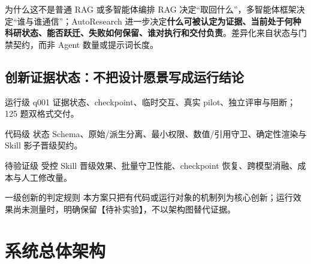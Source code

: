 \documentclass[10pt,a4paper,UTF8]{ctexart}
\begin{document}
\begin{innovationbox}{为什么这不是普通 RAG 或多智能体编排}
RAG 决定“取回什么”，多智能体框架决定“谁与谁通信”；AutoResearch 进一步决定\textbf{什么可被认定为证据、当前处于何种科研状态、能否跃迁、失败如何保留、谁对执行和交付负责}。差异化来自状态与门禁契约，而非 Agent 数量或提示词长度。
\end{innovationbox}

\subsection*{创新证据状态：不把设计愿景写成运行结论}
\begin{minipage}[t]{0.32\textwidth}\begin{evidencebox}{运行级}
q001 证据状态、checkpoint、临时交互、真实 pilot、独立评审与阻断；125 题双格式交付。
\end{evidencebox}\end{minipage}\hfill
\begin{minipage}[t]{0.32\textwidth}\begin{evidencebox}{代码级}
状态 Schema、原始/派生分离、最小权限、数值/引用守卫、确定性渲染与 Skill 影子晋级契约。
\end{evidencebox}\end{minipage}\hfill
\begin{minipage}[t]{0.32\textwidth}\begin{boundarybox}{待验证级}
受控 Skill 晋级效果、批量守卫性能、checkpoint 恢复、跨模型消融、成本与人工修改量。
\end{boundarybox}\end{minipage}

\begin{boundarybox}{一级创新的判定规则}
本方案只把有代码或运行对象的机制列为核心创新；运行效果尚未测量时，明确保留【待补实验】，不以架构图替代证据。
\end{boundarybox}
\clearpage

\section{系统总体架构}
\end{document}
